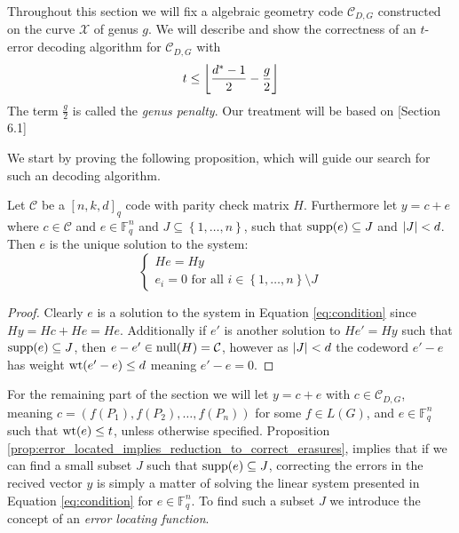 Throughout this section we will fix a algebraic geometry code $\mathcal{C}_{D, G}$ constructed on the curve $\mathcal{X}$ of genus $g$. We will describe and show the correctness of an $t$-error decoding algorithm for $\mathcal{C}_{D, G}$ with
\begin{equation*}
  t \leq \left\lfloor\frac{d^{*} - 1}{2} - \frac{g}{2}\right\rfloor
\end{equation*}
The term $\frac{g}{2}$ is called the \textit{genus penalty}. Our treatment will be based on \cite{AG_codes_and_applications}[Section 6.1]

We start by proving the following proposition, which will guide our search for such an decoding algorithm.
\begin{proposition}\label{prop:error_located_implies_reduction_to_correct_erasures}
  Let $\mathcal{C}$ be a $[n, k, d]_q$ code with parity check matrix $H$. Furthermore let $y = c + e$ where $c \in \mathcal{C}$ and $e \in \mathbb{F}_q^n$ and $J \subseteq \left\{1, \ldots, n\right\}$, such that $\textnormal{supp}(e) \subseteq J$ and $\left\lvert J\right\rvert < d$. Then $e$ is the unique solution to the system:
\begin{equation}\label{eq:condition}
  \begin{cases} He = Hy \\ e_i = 0 \text{ for all } i \in \left\{1, \ldots, n\right\} \setminus J\end{cases}
\end{equation}
\end{proposition}
\begin{proof}
Clearly $e$ is a solution to the system in Equation \eqref{eq:condition} since $Hy = Hc + He = He$. Additionally if $e'$ is another solution to $He' = Hy$ such that $\textnormal{supp}(e) \subseteq J$, then $e - e' \in \textnormal{null}(H) = \mathcal{C}$, however as $\left\lvert J\right\rvert < d$ the codeword $e' - e$ has weight $\mathrm{wt}(e' - e) \leq d$ meaning $e' - e = 0$.
\end{proof}

For the remaining part of the section we will let $y = c + e$ with $c  \in \mathcal{C}_{D, G}$, meaning $c = (f(P_{1}), f(P_{2}), \ldots, f(P_{n}))$ for some $f \in L(G)$, and $e \in \mathbb{F}_q^{n}$ such that $\mathrm{wt}(e) \leq t$, unless otherwise specified. Proposition \ref{prop:error_located_implies_reduction_to_correct_erasures}, implies that if we can find a small subset $J$ such that $\textnormal{supp}(e) \subseteq J$, correcting the errors in the recived vector $y$ is simply a matter of solving the linear system presented in Equation \eqref{eq:condition} for $e \in \mathbb{F}_q^n$. To find such a subset $J$ we introduce the concept of an \textit{error locating function}.


